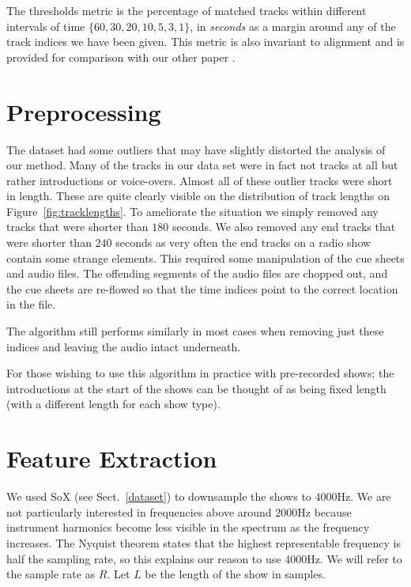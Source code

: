 \documentclass[twocolumn]{article}
\begin{document}
 The thresholds metric is the percentage of matched tracks within different intervals of time $\{60, 30, 20, 10, 5, 3, 1\}$, in \emph{seconds} as a margin around any of the track indices we have been given. This metric is also invariant to alignment and is provided for comparison with our other paper \cite{scarfe2013long}.

\section{Preprocessing}\label{proprocessing} %

The dataset had some outliers that may have slightly distorted the analysis of our method. Many of the tracks in our data set were in fact not tracks at all but rather introductions or voice-overs. Almost all of these outlier tracks were short in length. These are quite clearly visible on the distribution of track lengths on Figure~\ref{fig:tracklengths}. To ameliorate the situation we simply removed any tracks that were shorter than $180$ seconds. We also removed any end tracks that were shorter than $240$ seconds as very often the end tracks on a radio show contain some strange elements. This required some manipulation of the cue sheets and audio files. The offending segments of the audio files are chopped out, and the cue sheets are re-flowed so that the time indices point to the correct location in the file. 

The algorithm still performs similarly in most cases when removing just these indices and leaving the audio intact underneath. 

 For those wishing to use this algorithm in practice with pre-recorded shows; the introductions at the start of the shows can be thought of as being fixed length (with a different length for each show type).

\section{Feature Extraction}\label{feat_ex} %

We used SoX (see Sect.~\ref{dataset}) to downsample the shows to $4000$Hz. We are not particularly interested in frequencies above around $2000$Hz because instrument harmonics become less visible in the spectrum as the frequency increases. The Nyquist theorem \cite{nyquist1928certain} states that the highest representable frequency is half the sampling rate, so this explains our reason to use $4000$Hz. We will refer to the sample rate as $R$. Let $L$ be the length of the show in samples.
\end{document}
